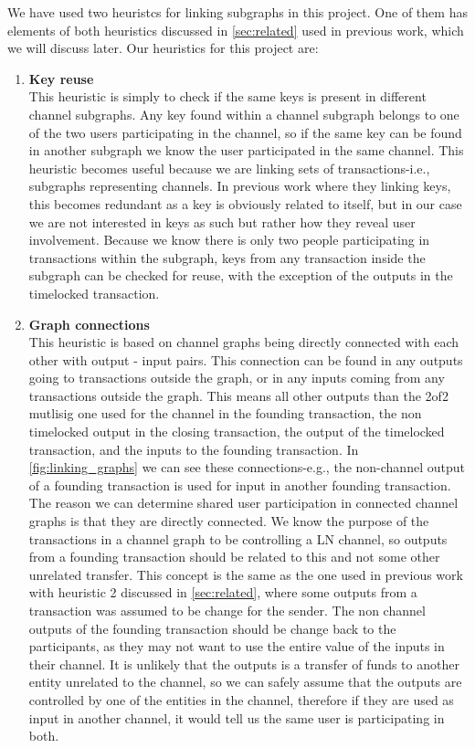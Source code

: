 We have used two heuristcs for linking subgraphs in this project. One of them has elements of both heuristics discussed in \cref{sec:related} used in previous work, which we will discuss later. Our heuristics for this project are: 

\begin{enumerate}

    \item \textbf{Key reuse}\\
This heuristic is simply to check if the same keys is present in different channel subgraphs.  
Any key found within a channel subgraph belongs to one of the two users participating in the channel, so if the same key can be found in another subgraph we know the user participated in the same channel.
This heuristic becomes useful because we are linking sets of transactions-i.e., subgraphs representing channels. In previous work where they linking keys, this becomes redundant as a key is obviously related to itself, but in our case we are not interested in keys as such but rather how they reveal user involvement. Because we know there is only two people participating in transactions within the subgraph, keys from any transaction inside the subgraph can be checked for reuse, with the exception of the outputs in the timelocked transaction.
\\

    \item \textbf{Graph connections}\\
This heuristic is based on channel graphs being directly connected with each other with output - input pairs. This connection can be found in any outputs going to transactions outside the graph, or in any inputs coming from any transactions outside the graph. This means all other outputs than the 2of2 mutlisig one used for the channel in the founding transaction, the non timelocked output in the closing transaction, the output of the timelocked transaction, and the inputs to the founding transaction. 
In \cref{fig:linking_graphs} we can see these connections-e.g., the non-channel output of a founding transaction is used for input in another founding transaction. The reason we can determine shared user participation in connected channel graphs is that they are directly connected. We know the purpose of the transactions in a channel graph to be controlling a LN channel, so outputs from a founding transaction should be related to this and not some other unrelated transfer. This concept is the same as the one used in previous work with heuristic 2 discussed in \cref{sec:related}, where some outputs from a transaction was assumed to be change for the sender. The non channel outputs of the founding transaction should be change back to the participants, as they may not want to use the entire value of the inputs in their channel. It is unlikely that the outputs is a transfer of funds to another entity unrelated to the channel, so we can safely assume that the outputs are controlled by one of the entities in the channel, therefore if they are used as input in another channel, it would tell us the same user is participating in both. 


\end{enumerate}
